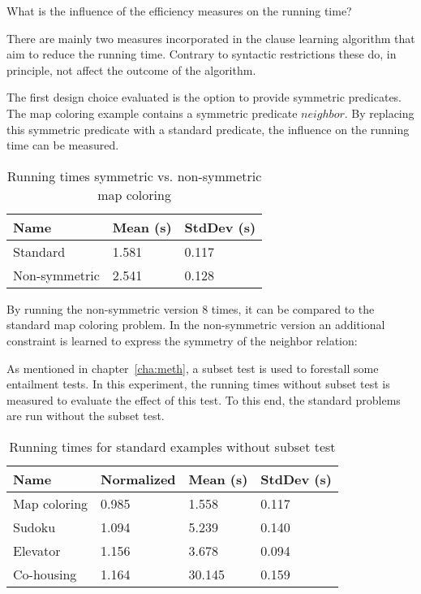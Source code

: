 \begin{question}
	What is the influence of the efficiency measures on the running time?
\end{question}

There are mainly two measures incorporated in the clause learning algorithm that aim to reduce the running time.
Contrary to syntactic restrictions these do, in principle, not affect the outcome of the algorithm.

\begin{experiment}
	The first design choice evaluated is the option to provide symmetric predicates.
	The map coloring example contains a symmetric predicate $\mathit{neighbor}$.
	By replacing this symmetric predicate with a standard predicate, the influence on the running time can be measured.

	\begin{table}[!htp]
		\begin{tabularx}{\textwidth}{XXX}
			\textbf{Name}	& \textbf{Mean (s)}	& \textbf{StdDev (s)} \\
			\toprule
			Standard 		& 1.581 			& 0.117 \\
			Non-symmetric 	& 2.541 			& 0.128 \\
		\end{tabularx}
		\label{tbl:exp_speed_symm}
		\caption{Running times symmetric vs. non-symmetric map coloring}
	\end{table}

	By running the non-symmetric version $8$ times, it can be compared to the standard map coloring problem.
	In the non-symmetric version an additional constraint is learned to express the symmetry of the neighbor relation: 
\end{experiment}

\begin{experiment}
	As mentioned in chapter~\ref{cha:meth}, a subset test is used to forestall some entailment tests.
	In this experiment, the running times without subset test is measured to evaluate the effect of this test.
	To this end, the standard problems are run without the subset test.

	\begin{table}[!htp]
		\begin{tabularx}{\textwidth}{XXXX}
			\textbf{Name}	& \textbf{Normalized}	& \textbf{Mean (s)}	& \textbf{StdDev (s)} \\
			\toprule
			Map coloring 	& 0.985					& 1.558				& 0.117 \\
			Sudoku 			& 1.094					& 5.239				& 0.140 \\
			Elevator 		& 1.156					& 3.678 			& 0.094 \\
			Co-housing 		& 1.164					& 30.145			& 0.159
		\end{tabularx}
		\label{tbl:exp_speed_no_subset}
		\caption{Running times for standard examples without subset test}
	\end{table}
\end{experiment}

